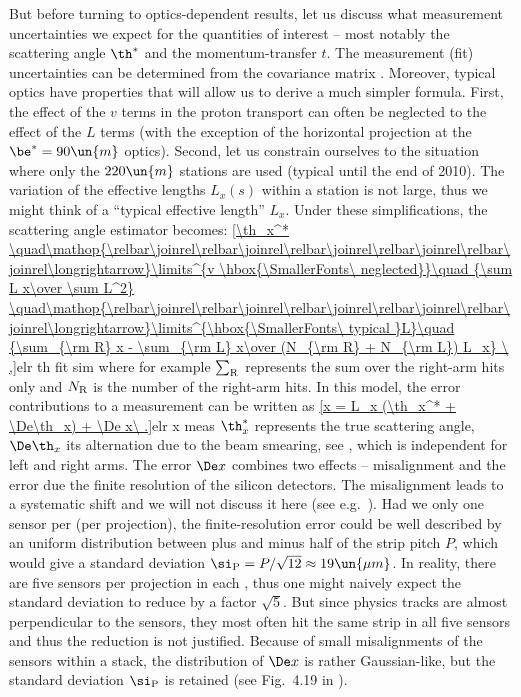 But before turning to optics-dependent results, let us discuss what measurement uncertainties we expect for the quantities of interest -- most notably the scattering angle $\th^*$ and the momentum-transfer $t$. The measurement (fit) uncertainties can be determined from the covariance matrix . Moreover, typical  optics
have properties that will allow us to derive a much simpler formula. First, the effect of the $v$ terms in the proton transport  can often be neglected to the effect of the $L$ terms (with the exception of the horizontal projection at the $\be^*=90\un{m}$ optics). Second, let us constrain ourselves to the situation where only the $220\un{m}$ stations are used (typical until the end of 2010). The variation of the effective lengths $L_x(s)$ within a station is not large, thus we might think of a ``typical effective length'' $L_x$. Under these simplifications, the scattering angle estimator becomes:
\eqref{\th_x^*
	\quad\mathop{\relbar\joinrel\relbar\joinrel\relbar\joinrel\relbar\joinrel\relbar\joinrel\longrightarrow}\limits^{v \hbox{\SmallerFonts\ neglected}}\quad
		{\sum L x\over \sum L^2}
	\quad\mathop{\relbar\joinrel\relbar\joinrel\relbar\joinrel\relbar\joinrel\relbar\joinrel\longrightarrow}\limits^{\hbox{\SmallerFonts\ typical }L}\quad
	{\sum_{\rm R} x - \sum_{\rm L} x\over (N_{\rm R} + N_{\rm L}) L_x}
\ ,}{elr th fit sim} 
where for example $\sum_{\rm R}$ represents the sum over the right-arm hits only and $N_{\rm R}$ is the number of the right-arm hits. In this model, the error contributions to a measurement can be written as
\eqref{x = L_x (\th_x^* + \De\th_x) + \De x\ .}{elr x meas}
$\th_x^*$ represents the true scattering angle, $\De\th_x$ its alternation due to the beam smearing, see , which is independent for left and right arms. The error $\De x$ combines two effects -- misalignment and the error due the finite resolution of the silicon detectors. The misalignment leads to a systematic shift and we will not discuss it here (see e.g.~). Had we only one sensor per  (per projection), the finite-resolution error could be well described by an uniform distribution between plus and minus half of the strip pitch $P$, which would give a standard deviation $\si_{\rm P} = P/\sqrt{12}\approx 19\un{\mu m}$. In reality, there are five sensors per projection in each , thus one might naively expect the standard deviation to reduce by a factor $\sqrt 5$. But since physics tracks are almost perpendicular to the sensors, they most often hit the same strip in all five sensors and thus the reduction is not justified. Because of small misalignments of the sensors within a stack, the distribution of $\De x$ is rather Gaussian-like, but the standard deviation $\si_{\rm P}$ is retained (see Fig.~4.19 in ).

